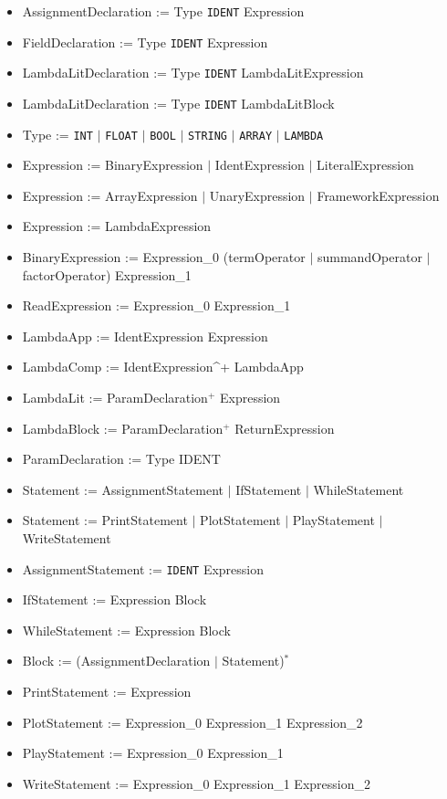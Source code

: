 \begin{itemize}
	\item AssignmentDeclaration := Type \texttt{IDENT} Expression
	\item FieldDeclaration := Type \texttt{IDENT} Expression
	\item LambdaLitDeclaration := Type \texttt{IDENT} LambdaLitExpression
	\item LambdaLitDeclaration := Type \texttt{IDENT} LambdaLitBlock
	\item Type := \texttt{INT} $|$ \texttt{FLOAT} $|$ \texttt{BOOL} $|$ \texttt{STRING} $|$ \texttt{ARRAY} $|$ \texttt{LAMBDA}

	\item Expression := BinaryExpression $|$ IdentExpression $|$ LiteralExpression
	\item Expression := ArrayExpression $|$ UnaryExpression $|$ FrameworkExpression
	\item Expression := LambdaExpression
	\item BinaryExpression := Expression_0 (termOperator $|$ summandOperator $|$ factorOperator) Expression_1
	\item ReadExpression := Expression_0 Expression_1
	\item LambdaApp := IdentExpression Expression
	\item LambdaComp := IdentExpression^+ LambdaApp
	\item LambdaLit := ParamDeclaration$^+$ Expression
	\item LambdaBlock := ParamDeclaration$^+$ ReturnExpression
	\item ParamDeclaration := Type IDENT
	
	\item Statement := AssignmentStatement $|$ IfStatement $|$ WhileStatement
	\item Statement := PrintStatement $|$ PlotStatement $|$ PlayStatement $|$ WriteStatement
	\item AssignmentStatement := \texttt{IDENT} Expression
	\item IfStatement := Expression Block
	\item WhileStatement := Expression Block
	\item Block := (AssignmentDeclaration $|$ Statement)$^*$
	\item PrintStatement := Expression
	\item PlotStatement := Expression_0 Expression_1 Expression_2
	\item PlayStatement := Expression_0 Expression_1
	\item WriteStatement := Expression_0 Expression_1 Expression_2
\end{itemize}

